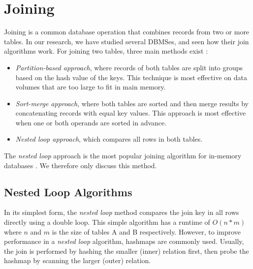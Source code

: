 \section{Joining}
\label{sec:Joining}
Joining is a common database operation that combines records from two or more tables. In our research, we have studied several DBMSes, and seen how their join algorithms work. For joining two tables, three main methods exist \cite{Bratbergsengen2015-ed}: 
\begin{itemize}
  \item \textit{Partition-based approach}, where records of both tables are split into groups based on the hash value of the keys. This technique is most effective on data volumes that are too large to fit in main memory.
  \item \textit{Sort-merge approach}, where both tables are sorted and then merge results by concatenating records with equal key values. This approach is most effective when one or both operands are sorted in advance.
  \item \textit{Nested loop approach}, which compares all rows in both tables.
\end{itemize}

The \textit{nested loop} approach is the most popular joining algorithm for in-memory databases \cite{Boncz2002-yj}. We therefore only discuss this method.

\subsection{Nested Loop Algorithms}
\label{sub:Nested Loop Algorithms}

In its simplest form, the \textit{nested loop} method compares the join key in all rows directly using a double loop. This simple algorithm has a runtime of $O(n*m)$ where $n$ and $m$ is the size of tables A and B respectively. However, to improve performance in a \textit{nested loop} algorithm, hashmaps are commonly used. Usually, the join is performed by hashing the smaller (inner) relation first, then probe the hashmap by scanning the larger (outer) relation. 


